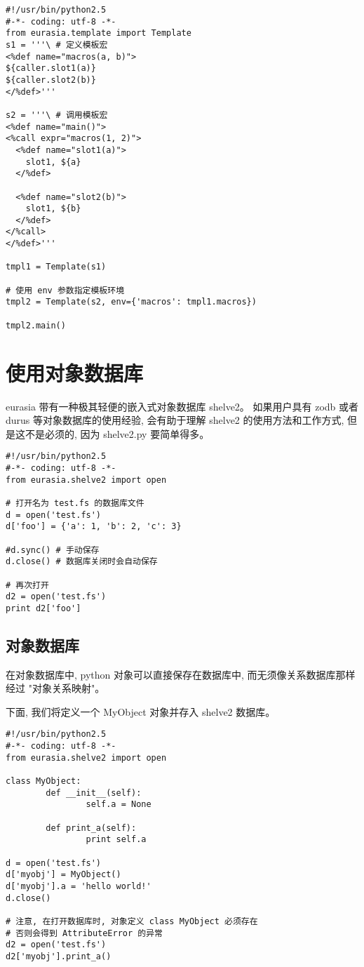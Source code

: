 \documentclass{manual}
\begin{document}
\begin{verbatim}
#!/usr/bin/python2.5
#-*- coding: utf-8 -*-
from eurasia.template import Template
s1 = '''\ # 定义模板宏
<%def name="macros(a, b)">
${caller.slot1(a)}
${caller.slot2(b)}
</%def>'''

s2 = '''\ # 调用模板宏
<%def name="main()">
<%call expr="macros(1, 2)">
  <%def name="slot1(a)">
    slot1, ${a}
  </%def>

  <%def name="slot2(b)">
    slot1, ${b}
  </%def>
</%call>
</%def>'''

tmpl1 = Template(s1)

# 使用 env 参数指定模板环境
tmpl2 = Template(s2, env={'macros': tmpl1.macros})

tmpl2.main()
\end{verbatim}

\section{使用对象数据库}

eurasia 带有一种极其轻便的嵌入式对象数据库 shelve2。
如果用户具有 zodb 或者 durus 等对象数据库的使用经验,
会有助于理解 shelve2 的使用方法和工作方式, 但是这不是必须的, 因为 shelve2.py 要简单得多。

\begin{verbatim}
#!/usr/bin/python2.5
#-*- coding: utf-8 -*-
from eurasia.shelve2 import open

# 打开名为 test.fs 的数据库文件
d = open('test.fs')
d['foo'] = {'a': 1, 'b': 2, 'c': 3}

#d.sync() # 手动保存
d.close() # 数据库关闭时会自动保存

# 再次打开
d2 = open('test.fs')
print d2['foo']
\end{verbatim}

\subsection{对象数据库}

在对象数据库中, python 对象可以直接保存在数据库中, 而无须像关系数据库那样经过 "对象关系映射"。

下面, 我们将定义一个 MyObject 对象并存入 shelve2 数据库。

\begin{verbatim}
#!/usr/bin/python2.5
#-*- coding: utf-8 -*-
from eurasia.shelve2 import open

class MyObject:
        def __init__(self):
                self.a = None

        def print_a(self):
                print self.a

d = open('test.fs')
d['myobj'] = MyObject()
d['myobj'].a = 'hello world!'
d.close()

# 注意, 在打开数据库时, 对象定义 class MyObject 必须存在
# 否则会得到 AttributeError 的异常
d2 = open('test.fs')
d2['myobj'].print_a()
\end{verbatim}
\end{document}
